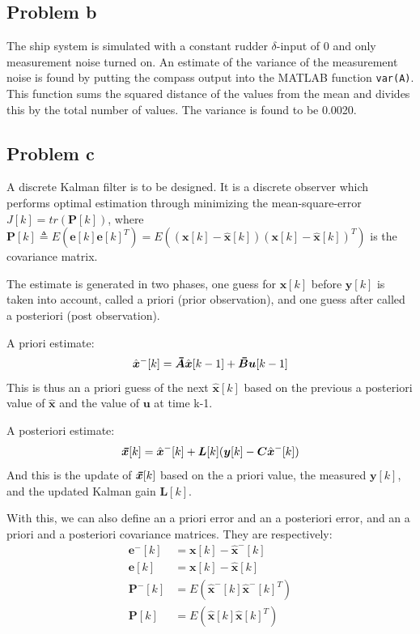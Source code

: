 \subsection{Problem b}
The ship system is simulated with a constant rudder $\delta$-input of 0 and only measurement noise turned on. An estimate of the variance of 
the measurement noise is found by putting the compass output into the MATLAB function {\texttt{var(A)}}. This function sums the squared distance of the values from the mean and divides this by the total number of values. The variance 
is found to be 0.0020.

\subsection{Problem c}
A discrete Kalman filter is to be designed. It is a discrete observer which performs optimal estimation through minimizing the mean-square-error $J[k] = tr(\bm{P}[k])$, where
$\bm{P}[k] \triangleq E(\bm{e}[k]\bm{e}[k]^T) = E((\bm{x}[k] - \hat{\bm{x}}[k])(\bm{x}[k] - \hat{\bm{x}}[k])^T)$ is the covariance matrix.

The estimate is generated in two phases, one guess for $\bm{x}[k]$ before $\bm{y}[k]$ is taken into account, called a priori (prior observation), and one guess after called a posteriori (post observation).

A priori estimate:
\begin{equation}
\hat{\bm{x}}^-[k] = \thickbar{\bm{A}}\hat{\bm{x}}[k-1]+\thickbar{\bm{B}}\bm{u}[k-1]
\end{equation}
This is thus an a priori guess of the next $\hat{\bm{x}}[k]$ based on the previous a posteriori value of $\hat{\bm{x}}$ and the value of $\bm{u}$ at time k-1.

A posteriori estimate:
\begin{equation}
\thickbar{\bm{x}}[k] = \hat{\bm{x}}^-[k] + \bm{L}[k](\bm{y}[k] - \bm{C}\hat{\bm{x}}^-[k])
\end{equation}
And this is the update of $\thickbar{\bm{x}}[k]$ based on the a priori value, the measured $\bm{y}[k]$, and the updated Kalman gain $\bm{L}[k]$.

With this, we can also define an a priori error and an a posteriori error, and an a priori and a posteriori covariance matrices. They are respectively:
\begin{align}
\bm{e}^-[k] &= \bm{x}[k] - \hat{\bm{x}}^-[k] \\
\bm{e}[k] &= \bm{x}[k] - \hat{\bm{x}}[k] \\
\bm{P}^-[k] &= E(\hat{\bm{x}}^-[k]\hat{\bm{x}}^-[k]^T) \\
\bm{P}[k] &= E(\hat{\bm{x}}[k]\hat{\bm{x}}[k]^T)
\end{align}

